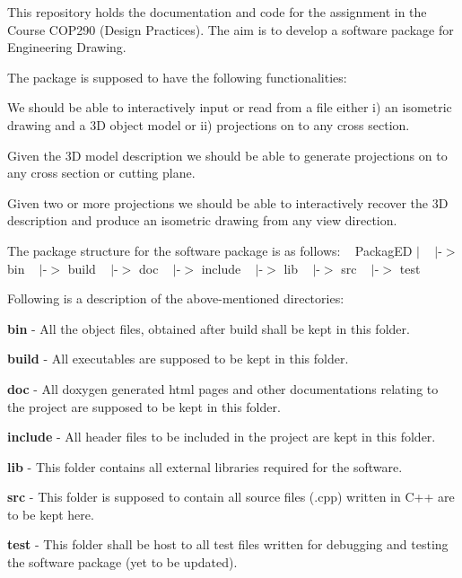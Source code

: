 This repository holds the documentation and code for the assignment in the Course C\+O\+P290 (Design Practices). The aim is to develop a software package for Engineering Drawing.

The package is supposed to have the following functionalities\+:
\begin{DoxyEnumerate}
\item We should be able to interactively input or read from a file either i) an isometric drawing and a 3D object model or ii) projections on to any cross section.
\item Given the 3D model description we should be able to generate projections on to any cross section or cutting plane.
\item Given two or more projections we should be able to interactively recover the 3D description and produce an isometric drawing from any view direction.
\end{DoxyEnumerate}

The package structure for the software package is as follows\+: ~\newline
Packag\+ED $\vert$ ~\newline
 $\vert$-\/$>$ bin ~\newline
 $\vert$-\/$>$ build ~\newline
 $\vert$-\/$>$ doc ~\newline
 $\vert$-\/$>$ include ~\newline
 $\vert$-\/$>$ lib ~\newline
 $\vert$-\/$>$ src ~\newline
 $\vert$-\/$>$ test ~\newline


Following is a description of the above-\/mentioned directories\+:
\begin{DoxyEnumerate}
\item {\bfseries bin} -\/ All the object files, obtained after build shall be kept in this folder.
\item {\bfseries build} -\/ All executables are supposed to be kept in this folder.
\item {\bfseries doc} -\/ All doxygen generated html pages and other documentations relating to the project are supposed to be kept in this folder.
\item {\bfseries include} -\/ All header files to be included in the project are kept in this folder.
\item {\bfseries lib} -\/ This folder contains all external libraries required for the software.
\item {\bfseries src} -\/ This folder is supposed to contain all source files (.cpp) written in C++ are to be kept here.
\item {\bfseries test} -\/ This folder shall be host to all test files written for debugging and testing the software package (yet to be updated). 
\end{DoxyEnumerate}